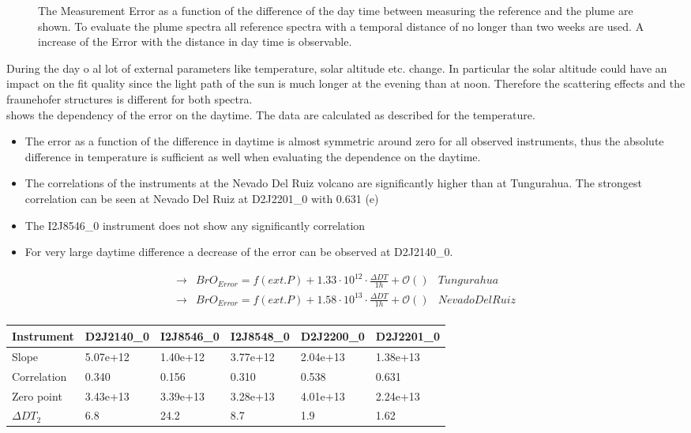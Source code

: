 \documentclass  [
  paper    = a4,
  BCOR     = 10mm,
  twoside,
  fontsize = 12pt,
  fleqn,
  toc      = bibnumbered,
  toc      = listofnumbered,
  numbers  = noendperiod,
  headings = normal,
  listof   = leveldown,
  version  = 3.03
]                                       {scrreprt}
\begin{document}
\begin{figure}
		\caption{The   Measurement Error as a function of the difference of the day time between measuring the reference and the plume are shown. To evaluate the plume spectra all reference spectra with a temporal distance of no longer than two weeks are used. A increase of the   Error with the distance in day time is observable.}
		\label{fig:diffdaytime}
	\end{figure}
	During the day o al lot of external parameters like temperature, solar altitude etc. change. In particular the solar altitude could have an impact on the fit quality since the light path of the sun is much longer at the evening than at noon. Therefore the scattering effects and the fraunehofer structures is different for both spectra.\\
	 shows the dependency of the  error on the daytime. The data are calculated as described for the temperature. 
	
	\begin{itemize}
		\item The   error as a function of the difference in daytime is almost symmetric around zero for all observed instruments, thus the absolute difference in temperature is sufficient as well when evaluating the dependence on the daytime.
		\item The correlations of the instruments at the Nevado Del Ruiz volcano are significantly higher than at Tungurahua. The strongest correlation can be seen at Nevado Del Ruiz at D2J2201\_0 with 0.631 (e)
		\item The I2J8546\_0 instrument does not show any significantly correlation
		\item For very large daytime difference a decrease of the   error can be observed at D2J2140\_0.
	\end{itemize}
		\begin{align*}
		\rightarrow&  BrO_{Error} = f(ext. P)+1.33\cdot10^{12}\cdot\frac{\Delta DT}{1h}  + \mathcal{O}\left(\right)& Tungurahua\\
		\rightarrow&  BrO_{Error} = f(ext. P)+1.58\cdot10^{13}\cdot\frac{\Delta DT}{1h} + \mathcal{O}\left(\right) & Nevado Del Ruiz\\
		\end{align*}

	\begin{table}[h]
		\begin{tabular}{|p{2cm}|p{2cm}|p{2cm}|p{2cm}|p{2cm}|p{2cm}|}
			Instrument	&D2J2140\_0&I2J8546\_0& I2J8548\_0&D2J2200\_0&D2J2201\_0\\
			\toprule
			Slope&5.07e+12&1.40e+12 &3.77e+12 &2.04e+13& 1.38e+13\\
			\midrule
			Correlation&
			0.340&
			0.156&
			0.310&
			0.538&
			0.631\\
			\midrule
			Zero point& 3.43e+13&3.39e+13&3.28e+13&  4.01e+13&  2.24e+13\\
			\midrule
			$\Delta DT_{2}$&6.8&24.2&8.7&1.9&1.62\\
			\bottomrule
		\end{tabular}
		\label{tab:dtcalc}
	\end{table}
\end{document}
